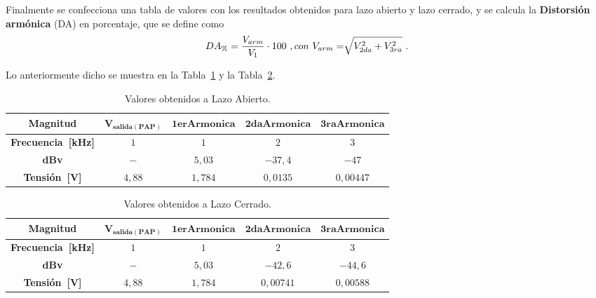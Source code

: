       Finalmente se confecciona una tabla de valores con los resultados obtenidos para lazo abierto y 
      lazo cerrado, y se calcula la 
      \textbf{Distorsión armónica} (DA) en porcentaje, que se define como 
        \begin{equation}
          DA_{\%}= \dfrac{V_{arm}}{V_{1}} \cdot 100~, \vspace{10pt} con~V_{arm}=\sqrt[]{V_{2da}^2+V_{3ra}^2}~.
          \label{eqn:DistorsionArmonica}
        \end{equation}
      
      Lo anteriormente dicho se muestra en la 
      Tabla~\ref{tab:Exp7DistArmLA} y la Tabla~\ref{tab:Exp7DistArmLC}.

      \begin{table}[H]
      \centering
        \begin{tabular}{ccccc} \hline \hline
          \textbf{Magnitud}            &   $\mathbf{V_{salida(PAP)}}$  &  $\mathbf{1erArmonica}$  & $\mathbf{2daArmonica}$  & $\mathbf{3raArmonica}$\\ \hline \hline
          \textbf{Frecuencia~[kHz]}    &   $1$                         &    $1$                   &   $2$                   & $3$ \\ \hline
          \textbf{dBv}                 &   $-$                         &    $5,03$                &   $-37,4$                & $-47$ \\ \hline
          \textbf{Tensión~[V]}         &   $4,88$                      &    $1,784$             &   $0,0135$              & $0,00447$\\ \hline \hline
          \end{tabular}
          \caption{Valores obtenidos a Lazo Abierto.}
          \label{tab:Exp7DistArmLA}
      \end{table}

     \begin{table}[H]
      \centering
        \begin{tabular}{ccccc} \hline \hline
          \textbf{Magnitud}            &   $\mathbf{V_{salida(PAP)}}$  &  $\mathbf{1erArmonica}$  & $\mathbf{2daArmonica}$  & $\mathbf{3raArmonica}$\\ \hline \hline
          \textbf{Frecuencia~[kHz]}    &   $1$                         &    $1$                   &   $2$                   & $3$ \\ \hline
          \textbf{dBv}                 &   $-$                         &    $5,03$                &   $-42,6$                & $-44,6$ \\\hline
          \textbf{Tensión~[V]}         &   $4,88$                      &    $1,784$             &   $0,00741$              & $0,00588$\\ \hline \hline
          \end{tabular}
          \caption{Valores obtenidos a Lazo Cerrado.}
          \label{tab:Exp7DistArmLC}
      \end{table}

